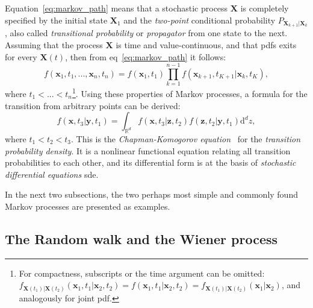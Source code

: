 \documentclass[a4paper,12pt]{book}
\begin{document}
Equation~\eqref{eq:markov_path} means that a stochastic process $\bm{X}$ is completely specified by the initial state $\bm{X}_1$ and the \textit{two-point} conditional probability $P_{\bm{X}_{k+1}|\bm{X}_{k}}$, also called \textit{transitional probability} or \textit{propagator} from one state to the next.
Assuming that the process $\bm{X}$ is time and value-continuous, and that \acrshort{pdf}s exits for every $\bm{X}(t)$, then from eq~\eqref{eq:markov_path} it follows:
\begin{equation}
    f(\bm{x}_1,t_1,...,\bm{x}_n,t_n) = f(\bm{x}_1,t_1)\prod_{k=1}^{n-1}  f(\bm{x}_{k+1},t_{K+1}|\bm{x}_{k},t_{K}),
\end{equation}
where $t_1 <... < t_n$\footnote{For compactness, subscripts or the time argument can be omitted: $f_{\bm{X}(t_1)|\bm{X}(t_2)}(\bm{x}_{1},t_{1}|\bm{x}_{2},t_{2})=f(\bm{x}_{1},t_{1}|\bm{x}_{2},t_{2})=f_{\bm{X}(t_1)|\bm{X}(t_2)}(\bm{x}_{1}|\bm{x}_{2})$, and analogously for joint \acrshort{pdf}.}. Using these properties of Markov processes, a formula for the  transition from arbitrary points can be derived:
\begin{equation}
    f(\bm{x},t_3|\bm{y},t_1) = \int_{\mathbb{R}^d}f(\bm{x},t_3|\bm{z},t_2)f(\bm{z},t_2|\bm{y},t_1)\mathrm{d}^dz,
\end{equation}
where $t_1<t_2<t_3$. This is the \textit{Chapman-Komogorov equation}~\parencite{chapman1928,Kolmogoroff1931} for the \textit{transition probability density}. It is a nonlinear functional equation relating all transition probabilities to each other, and its differential form is at the basis of \textit{stochastic differential equations} \acrshort{sde}. 

In the next two subsections, the two perhaps most simple and commonly found Markov processes are presented as examples.   

\subsection{The Random walk and the Wiener process}
\end{document}
